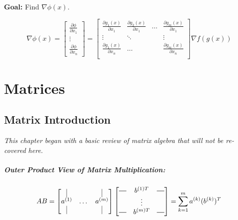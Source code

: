 \documentclass[a4paper,12pt]{report}
\newcommand*{\horzbar}{\rule[.5ex]{2.5ex}{0.5pt}}
\begin{document}
\textbf{Goal: } Find $\nabla\phi(x)$.

\begin{equation}
\nabla\phi(x) = 
\begin{bmatrix}
\frac{\partial \phi}{\partial x_1} \\
\vdots \\
\frac{\partial \phi}{\partial x_n} 
\end{bmatrix} = 
\begin{bmatrix}
\frac{\partial g_1(x)}{\partial x_1} & \frac{\partial g_2(x)}{\partial x_1} & \dots & \frac{\partial g_m(x)}{\partial x_1} \\
\vdots & \ddots & & \vdots \\
\frac{\partial g_1(x)}{\partial x_n} & \dots & & \frac{\partial g_m(x)}{\partial x_n} \\
\end{bmatrix} 
\nabla f(g(x))
\end{equation}



\chapter{Matrices}

\section{Matrix Introduction}

\textit{This chapter began with a basic review of matrix algebra that will not be re-covered here.} 

\paragraph{Outer Product View of Matrix Multiplication: } 

\begin{equation}
AB = 
\begin{bmatrix}
	\vrule & & \vrule \\
	a^{(1)} & \dots & a^{(m)} \\
	\vrule & & \vrule
\end{bmatrix}
\begin{bmatrix}
	\horzbar & b^{(1)T} & \horzbar \\
	 & \vdots & \\
	\horzbar & b^{(m)T} & \horzbar
\end{bmatrix} = 
\sum_{k=1}^{m} a^{(k)} (b^{(k)})^T
\end{equation}
\end{document}
